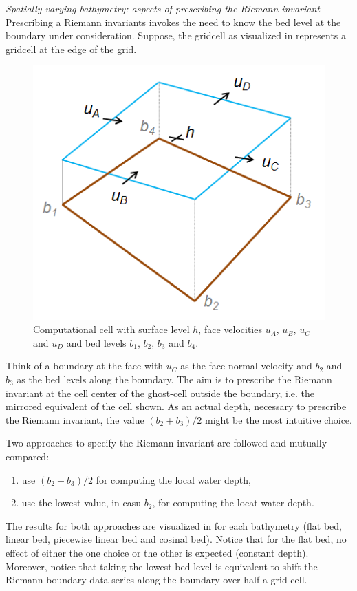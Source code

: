 \emph{Spatially varying bathymetry: aspects of prescribing the Riemann invariant}\newline
Prescribing a Riemann invariants invokes the need to know the bed level at the boundary under consideration. Suppose, the gridcell as visualized in  represents a gridcell at the edge of the grid. 
\begin{figure}[h!]
\begin{center}
\includegraphics[width=0.3\columnwidth]{figures/computationalcell.png}
\end{center}\caption{Computational cell with surface level $h$, face velocities $u_A$, $u_B$, $u_C$ and $u_D$ and bed levels $b_1$, $b_2$, $b_3$ and $b_4$. \label{fig:riemannbndcell}}
\end{figure}

Think of a boundary at the face with $u_C$ as the face-normal velocity and $b_2$ and $b_3$ as the bed levels along the boundary. The aim is to prescribe the Riemann invariant at the cell center of the ghost-cell outside the boundary, i.e. the mirrored equivalent of the cell shown. As an actual depth, necessary to prescribe the Riemann invariant, the value $(b_2 + b_3)/2$ might be the most intuitive choice.

Two approaches to specify the Riemann invariant are followed and mutually compared:
\begin{enumerate}
\item use $(b_2 + b_3)/2$ for computing the local water depth,
\item use the lowest value, in casu $b_2$, for computing the locat water depth.
\end{enumerate}
The results for both approaches are visualized in  for each bathymetry (flat bed, linear bed, piecewise linear bed and cosinal bed). Notice that for the flat bed, no effect of either the one choice or the other is expected (constant depth). Moreover, notice that taking the lowest bed level is equivalent to shift the Riemann boundary data series along the boundary over half a grid cell.

